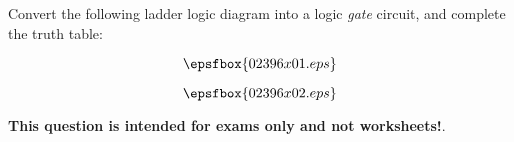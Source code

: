 

Convert the following ladder logic diagram into a logic {\it gate} circuit, and complete the truth table:

$$\epsfbox{02396x01.eps}$$







$$\epsfbox{02396x02.eps}$$







{\bf This question is intended for exams only and not worksheets!}.





